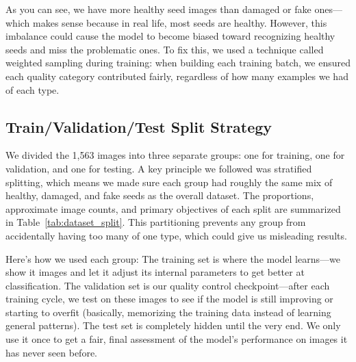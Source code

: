 As you can see, we have more healthy seed images than damaged or fake ones—which makes sense because in real life, most seeds are healthy. However, this imbalance could cause the model to become biased toward recognizing healthy seeds and miss the problematic ones. To fix this, we used a technique called weighted sampling during training: when building each training batch, we ensured each quality category contributed fairly, regardless of how many examples we had of each type.

\subsection{Train/Validation/Test Split Strategy}

We divided the 1,563 images into three separate groups: one for training, one for validation, and one for testing. A key principle we followed was stratified splitting, which means we made sure each group had roughly the same mix of healthy, damaged, and fake seeds as the overall dataset. The proportions, approximate image counts, and primary objectives of each split are summarized in Table~\ref{tab:dataset_split}. This partitioning prevents any group from accidentally having too many of one type, which could give us misleading results.

\begin{table}[htbp]
\centering
\caption{Dataset Split Statistics}
\label{tab:dataset_split}
\end{table}

Here's how we used each group: The training set is where the model learns—we show it images and let it adjust its internal parameters to get better at classification. The validation set is our quality control checkpoint—after each training cycle, we test on these images to see if the model is still improving or starting to overfit (basically, memorizing the training data instead of learning general patterns). The test set is completely hidden until the very end. We only use it once to get a fair, final assessment of the model's performance on images it has never seen before.

